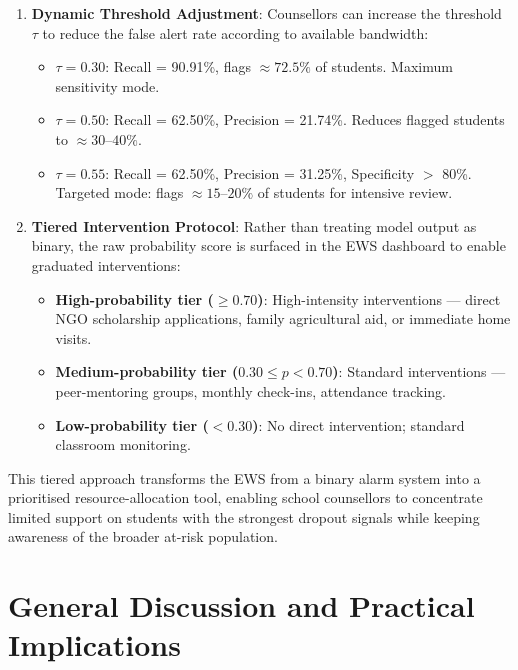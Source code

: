 \begin{enumerate}
    \item \textbf{Dynamic Threshold Adjustment}: Counsellors can increase the threshold $\tau$ to reduce the false alert rate according to available bandwidth:
        \begin{itemize}
            \item $\tau = 0.30$: Recall = 90.91\%, flags $\approx 72.5\%$ of students. Maximum sensitivity mode.
            \item $\tau = 0.50$: Recall = 62.50\%, Precision = 21.74\%. Reduces flagged students to $\approx 30$--$40\%$.
            \item $\tau = 0.55$: Recall = 62.50\%, Precision = 31.25\%, Specificity $>$ 80\%. Targeted mode: flags $\approx 15$--$20\%$ of students for intensive review.
        \end{itemize}

    \item \textbf{Tiered Intervention Protocol}: Rather than treating model output as binary, the raw probability score is surfaced in the EWS dashboard to enable graduated interventions:
        \begin{itemize}
            \item \textbf{High-probability tier ($\geq 0.70$)}: High-intensity interventions --- direct NGO scholarship applications, family agricultural aid, or immediate home visits.
            \item \textbf{Medium-probability tier ($0.30 \leq p < 0.70$)}: Standard interventions --- peer-mentoring groups, monthly check-ins, attendance tracking.
            \item \textbf{Low-probability tier ($< 0.30$)}: No direct intervention; standard classroom monitoring.
        \end{itemize}
\end{enumerate}

This tiered approach transforms the EWS from a binary alarm system into a prioritised resource-allocation tool, enabling school counsellors to concentrate limited support on students with the strongest dropout signals while keeping awareness of the broader at-risk population.

\section{General Discussion and Practical Implications}
\label{sec:general_discussion_implications}

